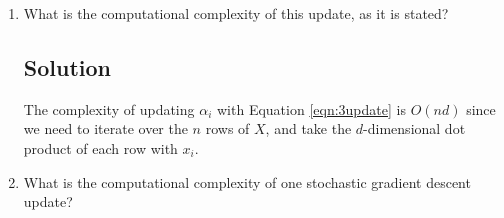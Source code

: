 \begin{enumerate}
  Start with $\alpha = 0$. Choose coordinate $i$ randomly, and update
  \begin{equation}
    \alpha_i = \argmin_z G\left(
      \alpha_1,\ldots,\alpha_{i-1},z,\alpha_{i+1},\ldots,\alpha_n
    \right).
  \end{equation}
  
  Show that the solution to the inner optimization problem for $\alpha_i$ is:
  \begin{equation}
    \alpha_i = \frac{y_i - \frac{1}{\lambda}\left(\sum_{j \neq i} \alpha_j x_j\right) \cdot x_i}
    {1 + \lVert x_i \rVert^2/\lambda}.
    \label{eqn:3update}
  \end{equation}

  \subsection*{Solution}
  \begin{proof}
    We can take the partial derivative of Equation \ref{eqn:3g} directly to obtain
    \begin{align}
      \frac{\partial{G}}{\partial{\alpha_i}}
      &= \alpha_i + \frac{1}{\lambda}\left(\alpha^\intercal X X^\intercal\right)_i - y_i
        \nonumber\\
      &= \alpha_i + \frac{1}{\lambda}\left(
        \alpha_i\left\lVert x_i\right\rVert^2 +
        \sum_{j \neq i} \alpha_j \left(x_j \cdot x_i \right)
        \right) - y_i. \label{eqn:3g_deriv}
    \end{align}

    Setting Equation \ref{eqn:3g_deriv} to $0$, solving for $\alpha_i$, and
    taking advantage of convexity, we find
    \begin{equation}
      \alpha_i = \frac{y_i - \left(\sum_{j \neq i}\alpha_j x_j \right) \cdot x_i}{
        1 + \lVert x_i \rVert^2/\lambda}
  \end{equation}
  minimizes Equation \ref{eqn:3g} as a function of $\alpha_i$, and solves the
  inner optimization problem.
\end{proof}

\item What is the computational complexity of this update, as it is stated?

  \subsection*{Solution}
  The complexity of updating $\alpha_i$ with Equation \ref{eqn:3update} is
  $O(nd)$ since we need to iterate over the $n$ rows of $X$, and take the
  $d$-dimensional dot product of each row with $x_i$.
\item What is the computational complexity of one stochastic gradient descent update?

\end{enumerate}

